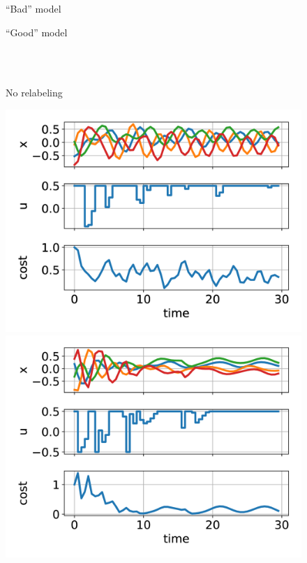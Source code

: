 \documentclass[
  letterpaper,
  DIV=11,
  numbers=noendperiod,
  oneside]{scrartcl}
\begin{document}
\begin{figure}

\begin{minipage}{0.33\linewidth}

\end{minipage}%
%
\begin{minipage}{0.33\linewidth}
``Bad'' model\end{minipage}%
%
\begin{minipage}{0.33\linewidth}
``Good'' model\end{minipage}%
\newline
\begin{minipage}{0.33\linewidth}
\\
\strut \\
No relabeling\end{minipage}%
%
\begin{minipage}{0.33\linewidth}
\includegraphics{figs/masses-noHER-badmodel.gif}\end{minipage}%
%
\begin{minipage}{0.33\linewidth}
\includegraphics{figs/masses-noHER-goodmodel.gif}\end{minipage}%

\end{figure}
\end{document}
